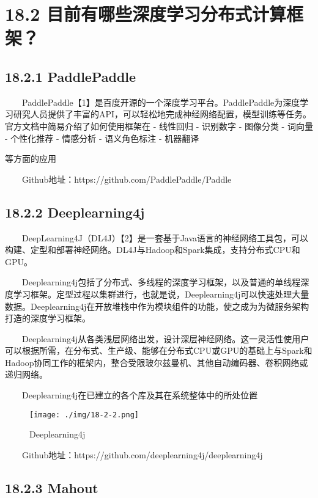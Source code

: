 \section{18.2
目前有哪些深度学习分布式计算框架？}\label{ux76eeux524dux6709ux54eaux4e9bux6df1ux5ea6ux5b66ux4e60ux5206ux5e03ux5f0fux8ba1ux7b97ux6846ux67b6}

\subsection{18.2.1 PaddlePaddle}\label{paddlepaddle}

  PaddlePaddle【1】是百度开源的一个深度学习平台。PaddlePaddle为深度学习研究人员提供了丰富的API，可以轻松地完成神经网络配置，模型训练等任务。
官方文档中简易介绍了如何使用框架在 - 线性回归 - 识别数字 - 图像分类 -
词向量 - 个性化推荐 - 情感分析 - 语义角色标注 - 机器翻译

等方面的应用

  Github地址：https://github.com/PaddlePaddle/Paddle

\subsection{18.2.2 Deeplearning4j}\label{deeplearning4j}

  DeepLearning4J（DL4J）【2】是一套基于Java语言的神经网络工具包，可以构建、定型和部署神经网络。DL4J与Hadoop和Spark集成，支持分布式CPU和GPU。

  Deeplearning4j包括了分布式、多线程的深度学习框架，以及普通的单线程深度学习框架。定型过程以集群进行，也就是说，Deeplearning4j可以快速处理大量数据。Deeplearning4j在开放堆栈中作为模块组件的功能，使之成为为微服务架构打造的深度学习框架。

  Deeplearning4j从各类浅层网络出发，设计深层神经网络。这一灵活性使用户可以根据所需，在分布式、生产级、能够在分布式CPU或GPU的基础上与Spark和Hadoop协同工作的框架内，整合受限玻尔兹曼机、其他自动编码器、卷积网络或递归网络。

  Deeplearning4j在已建立的各个库及其在系统整体中的所处位置

\begin{figure}
\centering
\texttt{[image: ./img/18-2-2.png]}
\caption{Deeplearning4j}
\end{figure}

  Github地址：https://github.com/deeplearning4j/deeplearning4j

\subsection{18.2.3 Mahout}\label{mahout}

